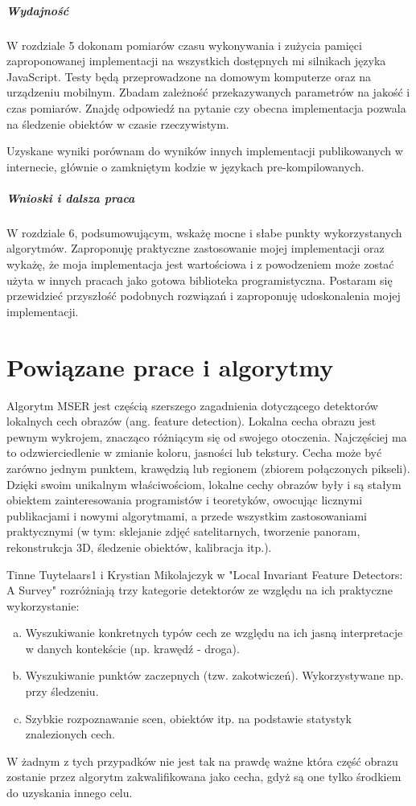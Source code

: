 \subparagraph{Wydajność}

W rozdziale 5 dokonam pomiarów czasu wykonywania i zużycia pamięci
zaproponowanej implementacji na wszystkich dostępnych mi silnikach języka
JavaScript. Testy będą przeprowadzone na domowym komputerze oraz na urządzeniu
mobilnym.  Zbadam zależność przekazywanych parametrów na jakość i czas
pomiarów. Znajdę odpowiedź na pytanie czy obecna implementacja pozwala na
śledzenie obiektów w czasie rzeczywistym.

Uzyskane wyniki porównam do wyników innych implementacji publikowanych w
internecie, głównie o zamkniętym kodzie w językach pre-kompilowanych.

\subparagraph{Wnioski i dalsza praca}

W rozdziale 6, podsumowującym, wskażę mocne i słabe punkty wykorzystanych
algorytmów. Zaproponuję praktyczne zastosowanie mojej implementacji oraz
wykażę, że moja implementacja jest wartościowa i z powodzeniem może zostać
użyta w innych pracach jako gotowa biblioteka programistyczna. Postaram się
przewidzieć przyszłość podobnych rozwiązań i zaproponuję udoskonalenia mojej
implementacji.

\section{Powiązane prace i algorytmy}

Algorytm MSER jest częścią szerszego zagadnienia dotyczącego detektorów
lokalnych cech obrazów (ang. feature detection). Lokalna cecha obrazu jest
pewnym wykrojem, znacząco różniącym się od swojego otoczenia.  Najczęściej ma
to odzwierciedlenie w zmianie koloru, jasności lub tekstury.  Cecha może być
zarówno jednym punktem, krawędzią lub regionem (zbiorem połączonych pikseli).
Dzięki swoim unikalnym właściwościom, lokalne cechy obrazów były i są stałym
obiektem zainteresowania programistów i teoretyków, owocując licznymi
publikacjami i nowymi algorytmami, a przede wszystkim zastosowaniami
praktycznymi (w tym: sklejanie zdjęć satelitarnych, tworzenie panoram,
rekonstrukcja 3D, śledzenie obiektów, kalibracja itp.).

Tinne Tuytelaars1 i Krystian Mikolajczyk w "Local Invariant Feature Detectors:
A Survey" \cite{survey} rozróżniają trzy kategorie detektorów ze względu na
ich praktyczne wykorzystanie: \begin{enumerate}[a)] \item Wyszukiwanie
konkretnych typów cech ze względu na ich jasną interpretacje w danych
kontekście (np. krawędź - droga). \item Wyszukiwanie punktów zaczepnych (tzw.
zakotwiczeń). Wykorzystywane np. przy śledzeniu. \item Szybkie rozpoznawanie
scen, obiektów itp. na podstawie statystyk znalezionych cech. \end{enumerate} W
żadnym z tych przypadków nie jest tak na prawdę ważne która część obrazu
zostanie przez algorytm zakwalifikowana jako cecha, gdyż są one tylko środkiem
do uzyskania innego celu.

